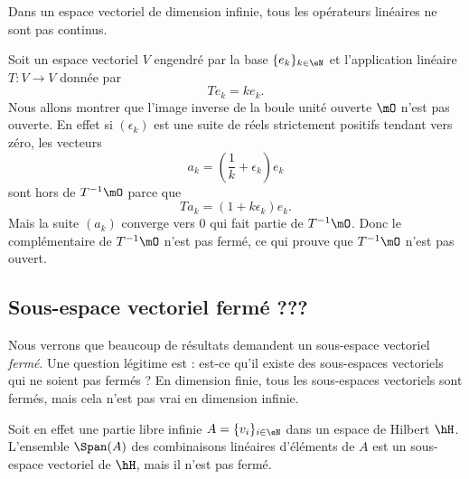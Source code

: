 Dans un espace vectoriel de dimension infinie, tous les opérateurs linéaires ne sont pas continus.

\begin{example}
    Soit un espace vectoriel \( V\) engendré par la base \( \{ e_k \}_{k\in \eN}\) et l'application linéaire \( T\colon V\to V\) donnée par
    \begin{equation}
        Te_k=ke_k.
    \end{equation}
    Nous allons montrer que l'image inverse de la boule unité ouverte \( \mO\) n'est pas ouverte. En effet si \( (\epsilon_k)\) est une suite de réels strictement positifs tendant vers zéro, les vecteurs
    \begin{equation}
        a_k=\left( \frac{1}{ k }+\epsilon_k \right)e_k
    \end{equation}
    sont hors de \( T^{-1}\mO\) parce que
    \begin{equation}
        Ta_k=(1+k\epsilon_k)e_k.
    \end{equation}
    Mais la suite \( (a_k)\) converge vers \( 0\) qui fait partie de \( T^{-1}\mO\). Donc le complémentaire de \( T^{-1}\mO\) n'est pas fermé, ce qui prouve que \( T^{-1}\mO\) n'est pas ouvert.
\end{example}

\subsection{Sous-espace vectoriel fermé ???}

Nous verrons que beaucoup de résultats demandent un sous-espace vectoriel \emph{fermé}. Une question légitime est : est-ce qu'il existe des sous-espaces vectoriels qui ne soient pas fermés ? En dimension finie, tous les sous-espaces vectoriels sont fermés, mais cela n'est pas vrai en dimension infinie.

Soit en effet une partie libre infinie \( A=\{ v_i \}_{i\in \eN}\) dans un espace de Hilbert \( \hH\). L'ensemble $\Span(A)$ des combinaisons linéaires d'éléments de \( A\) est un sous-espace vectoriel de \( \hH\), mais il n'est pas fermé.

